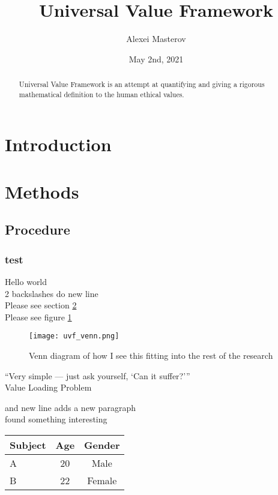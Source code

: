 \documentclass{article} %
\author{Alexei Masterov}
\title{Universal Value Framework}
\date{May 2nd, 2021}
\begin{document}
\maketitle %

\newpage
\begin{abstract}
Universal Value Framework is an attempt at quantifying and giving a rigorous mathematical definition to the human ethical values.
\end{abstract}
\tableofcontents
\newpage
\section{Introduction}

\section{Methods}\label{sec:methods}
\subsection{Procedure} 
\subsubsection{test}

Hello world\\
2 backslashes do new line\\

Please see section \ref{sec:methods}\\ %
Please see figure \ref{fig:venn}

\begin{figure}[!h] %
 \begin{center}
  \texttt{[image: uvf\_venn.png]}
  \caption{Venn diagram of how I see this fitting into the rest of the research}
  \label{fig:venn}
 \end{center}
\end{figure}

“Very simple — just ask yourself, ‘Can it suffer?’” \\

Value Loading Problem 

and new line adds a new paragraph\\

\cite{Schulz:2010vk} found something interesting\\

\begin{tabular}{l|c|c}
Subject  &  Age     & Gender\\
\hline
A & 20 & Male\\
B & 22 & Female\\
\end{tabular}

\end{document}
